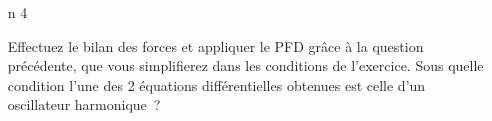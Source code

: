 \documentclass[a4paper, 10pt, final, garamond]{book}
\begin{document}
\begin{enumerate}[label=\sqenumi]
\begin{minipage}[t]{.20\linewidth}
\begin{center}
{			      }
			      \vspace{-15pt}
			      \captionsetup{justification=centering}
		      \end{center}
	      \end{minipage}
	\item[n]{4}%
	      \noindent
	      \begin{minipage}[t]{.70\linewidth}
		      Effectuez le bilan des forces et appliquer le PFD grâce à la question
		      précédente, que vous simplifierez dans les conditions de l'exercice.
		      Sous quelle condition l'une des 2 équations différentielles obtenues
		      est celle d'un oscillateur harmonique~?
		      \smallbreak
	      \end{minipage}
	      \hfill
	      \begin{minipage}[t]{0.25\linewidth}
		      \vspace*{0pt}
		      \begin{center}

\end{center}
\end{minipage}
\end{enumerate}
\end{document}
